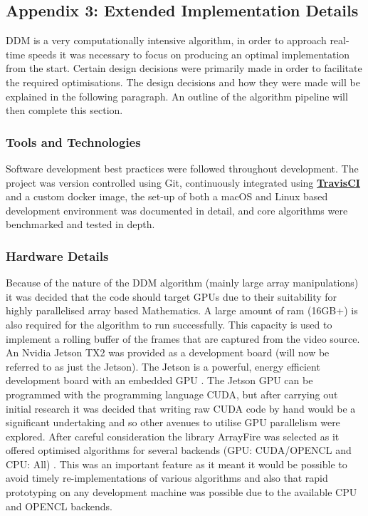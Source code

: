 \documentclass[10pt]{article}
\let\oldhref\href
\renewcommand{\href}[2]{\oldhref{#1}{\bfseries#2}}
\begin{document}
\subsection{Appendix 3: Extended Implementation Details}
\label{section:implementation}

DDM is a very computationally intensive algorithm, in order to approach real-time speeds it was necessary to focus on producing an optimal implementation from the start. Certain design decisions were primarily made in order to facilitate the required optimisations. The design decisions and how they were made will be explained in the following paragraph. An outline of the algorithm pipeline will then complete this section.

\subsubsection{Tools and Technologies}
Software development best practices were followed throughout development. The project was version controlled using Git, continuously integrated using \href{https://travis-ci.com}{TravisCI} and a custom docker image, the set-up of both a macOS and Linux based development environment was documented in detail, and core algorithms were benchmarked and tested in depth.

\subsubsection{Hardware Details}
Because of the nature of the DDM algorithm (mainly large array manipulations) it was decided that the code should target GPUs due to their suitability for highly parallelised array based Mathematics. A large amount of ram (16GB+) is also required for the algorithm to run successfully. This capacity is used to implement a rolling buffer of the frames that are captured from the video source. An Nvidia Jetson TX2 was provided as a development board (will now be referred to as just the Jetson). The Jetson is a powerful, energy efficient development board with an embedded GPU \cite{jetson}. The Jetson GPU can be programmed with the programming language CUDA, but after carrying out initial research \cite{cuda_book} it was decided that writing raw CUDA code by hand would be a significant undertaking and so other avenues to utilise GPU parallelism were explored. After careful consideration the library ArrayFire was selected as it offered optimised algorithms for several backends (GPU: CUDA/OPENCL and CPU: All) \cite{arrayfire}. This was an important feature as it meant it would be possible to avoid timely re-implementations of various algorithms and also that rapid prototyping on any development machine was possible due to the available CPU and OPENCL backends.
\end{document}
